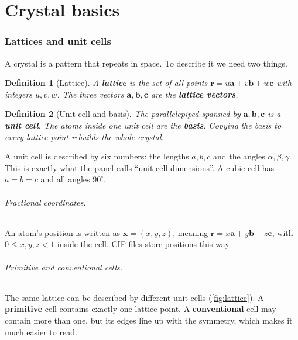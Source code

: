 \documentclass[11pt,a4paper]{article}
\newtheorem{definition}{Definition}
\theoremstyle{remark}\newtheorem*{example}{Worked example}
\newcommand{\vect}[1]{\mathbf{#1}}
\begin{document}
\part{Crystal basics}
\section{Lattices and unit cells}\label{sec:lattice}

A crystal is a pattern that repeats in space. To describe it we need two things.

\begin{definition}[Lattice]
A \textbf{lattice} is the set of all points $\vect{r} = u\vect{a} + v\vect{b} + w\vect{c}$ with integers $u,v,w$. The three vectors $\vect{a},\vect{b},\vect{c}$ are the \textbf{lattice vectors}.
\end{definition}

\begin{definition}[Unit cell and basis]
The parallelepiped spanned by $\vect{a},\vect{b},\vect{c}$ is a \textbf{unit cell}. The atoms inside one unit cell are the \textbf{basis}. Copying the basis to every lattice point rebuilds the whole crystal.
\end{definition}

A unit cell is described by six numbers: the lengths $a,b,c$ and the angles $\alpha,\beta,\gamma$. This is exactly what the panel calls ``unit cell dimensions''. A cubic cell has $a=b=c$ and all angles $90^\circ$.

\paragraph{Fractional coordinates.} An atom's position is written as $\vect{x}=(x,y,z)$, meaning $\vect{r}=x\vect{a}+y\vect{b}+z\vect{c}$, with $0\le x,y,z<1$ inside the cell. CIF files store positions this way.

\paragraph{Primitive and conventional cells.} The same lattice can be described by different unit cells (\autoref{fig:lattice}). A \textbf{primitive} cell contains exactly one lattice point. A \textbf{conventional} cell may contain more than one, but its edges line up with the symmetry, which makes it much easier to read.
\end{document}
